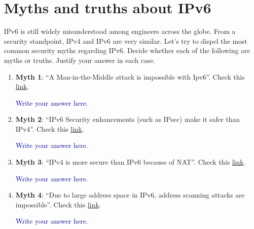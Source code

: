 \documentclass{article}
\begin{document}

\section*{Myths and truths about IPv6}

IPv6 is still widely misunderstood among engineers across the globe. From a security
standpoint, IPv4 and IPv6 are very similar. Let's try to dispel the most common security
myths regarding IPv6. Decide whether each of the following are myths or truths. Justify
your answer in each case.

  \begin{enumerate}
  \item \textbf{Myth 1}: ``A Man-in-the-Middle attack is impossible with Ipv6''.
    Check this
    \href{https://www.eweek.com/security/attackers-can-use-ipv6-to-launch-man-in-the-middle-attacks}{link}. \\ \smallskip

    \textcolor{darkblue}{%
      Write your answer here.
      }
    
    \medskip
    
  \item \textbf{Myth  2}: ``IPv6 Security enhancements (such as IPsec) make it
    safer than IPv4''. Check this
    \href{http://www.ipv6now.com.au/primers/IPv6PacketSecurity.php}{link}. \\ \smallskip 

     \textcolor{darkblue}{%
      Write your answer here.
      }
    
    
    
    \medskip
  \item \textbf{Myth 3}: ``IPv4 is more secure than IPv6 because of NAT''. Check this \href{https://security.stackexchange.com/questions/44065/with-ipv6-do-we-need-to-use-nat-any-more}{link}. \\ \smallskip 

     \textcolor{darkblue}{%
      Write your answer here.
      }
    
    
    
    \medskip
    
  \item \textbf{Myth  4}: ``Due to large address space in IPv6, address
    scanning attacks are impossible''. Check this \href{https://www.internetsociety.org/blog/2015/02/ipv6-security-myth-4-ipv6-networks-are-too-big-to-scan/}{link}. \\ \smallskip 

     \textcolor{darkblue}{%
      Write your answer here.
      }
    
    
    
    \medskip

  \end{enumerate}

 
\end{document}
